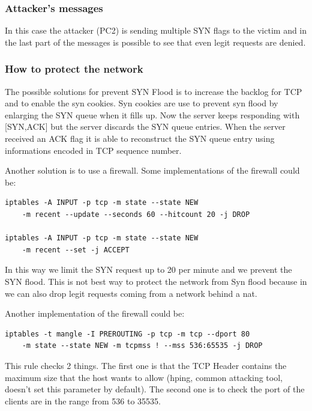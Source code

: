 \subsubsection{Attacker's messages}



In this case the attacker (PC2) is sending multiple SYN flags to the victim and in the last part of the messages is possible to see that even legit requests are denied.\par

\subsubsection{How to protect the network}
The possible solutions for prevent SYN Flood is to increase the backlog for TCP and to enable the syn cookies. Syn cookies are use to prevent syn flood by enlarging the SYN queue when it fills up. Now the server keeps responding with [SYN,ACK] but the server discards the SYN queue entries. When the server received an ACK flag it is able to reconstruct the SYN queue entry using informations encoded in TCP sequence number.\par
Another solution is to use a firewall. Some implementations of the firewall could be:\\
\begin{lstlisting}
iptables -A INPUT -p tcp -m state --state NEW
    -m recent --update --seconds 60 --hitcount 20 -j DROP

iptables -A INPUT -p tcp -m state --state NEW
    -m recent --set -j ACCEPT
\end{lstlisting}
In this way we limit the SYN request up to 20 per minute and we prevent the SYN flood. This is not best way to protect the network from Syn flood because in we can also drop legit requests coming from a network behind a nat.\par
Another implementation of the firewall could be:\\
\begin{lstlisting}
iptables -t mangle -I PREROUTING -p tcp -m tcp --dport 80
    -m state --state NEW -m tcpmss ! --mss 536:65535 -j DROP
\end{lstlisting}
This rule checks 2 things. The first one is that the TCP Header contains the maximum size that the host wants to allow (hping, common attacking tool, doesn’t set this parameter by default). The second one is to check the port of the clients are in the range from 536 to 35535.\par
